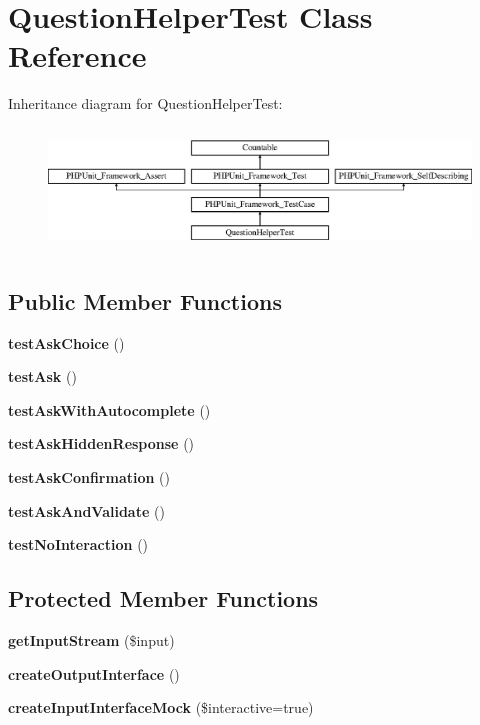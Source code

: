 \section{Question\+Helper\+Test Class Reference}
\label{class_symfony_1_1_component_1_1_console_1_1_tests_1_1_helper_1_1_question_helper_test}
Inheritance diagram for Question\+Helper\+Test\+:\begin{figure}[H]
\begin{center}
\leavevmode
\includegraphics[height=3.303835cm]{class_symfony_1_1_component_1_1_console_1_1_tests_1_1_helper_1_1_question_helper_test}
\end{center}
\end{figure}
\subsection*{Public Member Functions}
\begin{DoxyCompactItemize}
\item 
{\bf test\+Ask\+Choice} ()
\item 
{\bf test\+Ask} ()
\item 
{\bf test\+Ask\+With\+Autocomplete} ()
\item 
{\bf test\+Ask\+Hidden\+Response} ()
\item 
{\bf test\+Ask\+Confirmation} ()
\item 
{\bf test\+Ask\+And\+Validate} ()
\item 
{\bf test\+No\+Interaction} ()
\end{DoxyCompactItemize}
\subsection*{Protected Member Functions}
\begin{DoxyCompactItemize}
\item 
{\bf get\+Input\+Stream} (\$input)
\item 
{\bf create\+Output\+Interface} ()
\item 
{\bf create\+Input\+Interface\+Mock} (\$interactive=true)
\end{DoxyCompactItemize}
